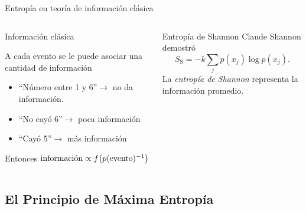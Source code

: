 \begin{frame}{Entropía en teoría de información clásica}
    \begin{columns}
        \begin{column}{0.5\textwidth}
            \begin{block}{Información clásica}
            \begin{center}
                A cada evento se le puede asociar una cantidad de información\pause
            \end{center}
            \begin{itemize}
                \item ``Número entre 1 y 6''$\rightarrow$ no da información. \pause
                \item ``No cayó 6''$\rightarrow$ poca información\pause
                \item ``Cayó 5''$\rightarrow$ más información\pause
            \end{itemize}
            Entonces $\text{información}\propto f\qty(p(\text{evento})^{-1})$
        \end{block}
        \end{column}
        \pause
        \begin{column}{0.5\textwidth}
            \begin{block}{Entropía de Shannon}
            Claude Shannon demostró
            \begin{equation}
                S_{\text{S}}=-k\sum_{j}p(x_{j})\log{p(x_{j})}.\nonumber
            \end{equation}\pause
            La \textit{entropía de Shannon} representa la información promedio.
        \end{block}
        \end{column}
    \end{columns}
\end{frame}

\subsection{El Principio de Máxima Entropía}

